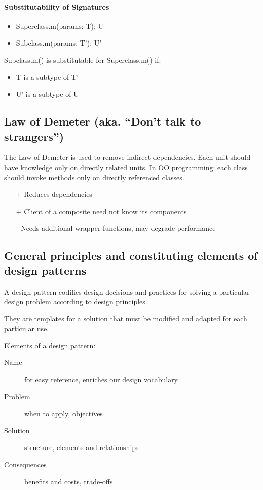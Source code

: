 \paragraph{Substitutability of Signatures}
\begin{itemize}
	\item Superclass.m(params: T): U
	\item Subclass.m(params: T'): U'
\end{itemize}
Subclass.m() is substitutable for Superclass.m() if:
\begin{itemize}
	\item T is a subtype of T'
	\item U' is a subtype of U
\end{itemize}

\subsection{Law of Demeter (aka. \enquote{Don't talk to strangers})}
The Law of Demeter is used to remove indirect dependencies.
Each unit should have knowledge only on directly related units. \newline
In OO programming: each class should invoke methods only on directly referenced classes.

\begin{itemize}
    \item[+] Reduces dependencies
    \item[+] Client of a composite need not know its components
    \item[-] Needs additional wrapper functions, may degrade performance
\end{itemize}

\subsection{General principles and constituting elements of design patterns}

A design pattern codifies design decisions and practices for solving a particular design
problem according to design principles. \newline

They are templates for a solution that must be modified and adapted for each particular use. \newline

Elements of a design pattern:

\begin{description}
    \item[Name] for easy reference, enriches our design vocabulary
    \item[Problem] when to apply, objectives
    \item[Solution] structure, elements and relationships
    \item[Consequences] benefits and costs, trade-offs
\end{description}
